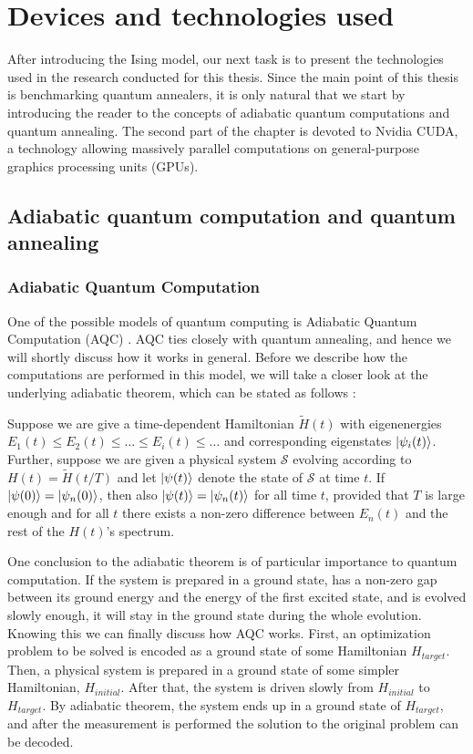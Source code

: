 \chapter{Devices and technologies used}
\label{chapter:near-term}

After introducing the Ising model, our next task is to present the technologies
used in the research conducted for this thesis. Since the main point of this
thesis is benchmarking quantum annealers, it is only natural that we start by
introducing the reader to the concepts of adiabatic quantum computations and
quantum annealing. The second part of the chapter is devoted to Nvidia CUDA, a
technology allowing massively parallel computations on general-purpose graphics
processing units (GPUs).

\section[AQC and quantum annealing]{Adiabatic quantum computation and quantum annealing}

\subsection{Adiabatic Quantum Computation}
One of the possible models of quantum computing is Adiabatic Quantum
Computation (AQC) \cite{farhi}. AQC ties closely with quantum annealing, and
hence we will shortly discuss how it works in general. Before we describe how
the computations are performed in this model, we will take a closer look at the
underlying adiabatic theorem, which can be stated as follows \cite{farhi,
  born}:

\begin{theorem}
  Suppose we are give a time-dependent Hamiltonian $\tilde{H}(t)$ with
  eigenenergies $E_1(t) \le E_2(t) \le \ldots \le E_i(t) \le \ldots$ and
  corresponding eigenstates $\ket{\psi_i(t)}$. Further, suppose we are given a
  physical system $\mathcal{S}$ evolving according to $H(t) = \tilde{H}(t/T)$ and
  let $\ket{\psi(t)}$ denote the state of $\mathcal{S}$ at time $t$. If
  $\ket{\psi(0)} = \ket{\psi_n(0)}$, then also $\ket{\psi(t)} = \ket{\psi_n(t)}$
  for all time $t$, provided that $T$ is large enough and for all $t$ there
  exists a non-zero difference between $E_n(t)$ and the rest of the $H(t)$'s
  spectrum.
\end{theorem}

One conclusion to the adiabatic theorem is of particular importance to quantum
computation. If the system is prepared in a ground state, has a non-zero gap
between its ground energy and the energy of the first excited state, and is
evolved slowly enough, it will stay in the ground state during the whole
evolution. Knowing this we can finally discuss how AQC works. First, an
optimization problem to be solved is encoded as a ground state of some
Hamiltonian $H_{target}$. Then, a physical system is prepared in a ground state
of some simpler Hamiltonian, $H_{initial}$. After that, the system is driven
slowly from $H_{initial}$ to $H_{target}$. By adiabatic theorem, the system
ends up in a ground state of $H_{target}$, and after the measurement is
performed the solution to the original problem can be decoded.

